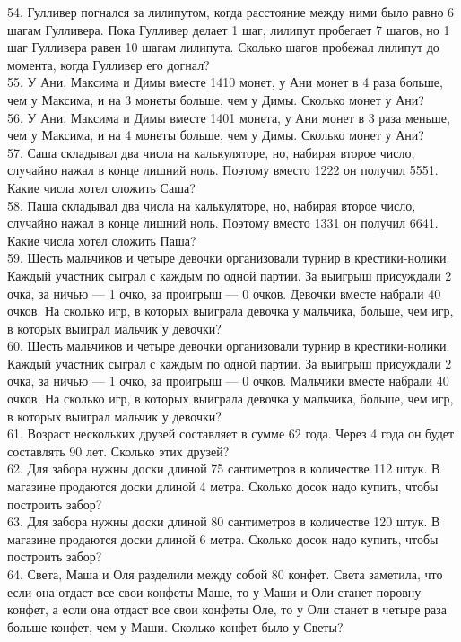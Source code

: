 54. Гулливер погнался за лилипутом, когда расстояние между ними было равно 6 шагам Гулливера. Пока Гулливер делает 1 шаг, лилипут пробегает 7 шагов, но 1 шаг Гулливера равен 10 шагам лилипута. Сколько шагов пробежал лилипут до момента, когда Гулливер его догнал?\\
55. У Ани, Максима и Димы вместе 1410 монет, у Ани монет в 4 раза больше, чем у Максима, и на 3 монеты больше, чем у Димы. Сколько монет у Ани?\\
56. У Ани, Максима и Димы вместе 1401 монета, у Ани монет в 3 раза меньше, чем у Максима, и на 4 монеты больше, чем у Димы. Сколько монет у Ани?\\
57. Саша складывал два числа на калькуляторе, но, набирая второе число, случайно нажал в конце лишний ноль. Поэтому вместо 1222 он получил 5551. Какие числа хотел сложить Саша?\\
58. Паша складывал два числа на калькуляторе, но, набирая второе число, случайно нажал в конце лишний ноль. Поэтому вместо 1331 он получил 6641. Какие числа хотел сложить Паша?\\
59. Шесть мальчиков и четыре девочки организовали турнир в крестики-нолики. Каждый участник сыграл с каждым по одной партии. За выигрыш присуждали 2 очка, за ничью --- 1 очко, за проигрыш --- 0 очков. Девочки вместе набрали 40 очков. На сколько игр, в которых выиграла девочка у мальчика, больше, чем игр, в которых выиграл мальчик у девочки?\\
60. Шесть мальчиков и четыре девочки организовали турнир в крестики-нолики. Каждый участник сыграл с каждым по одной партии. За выигрыш присуждали 2 очка, за ничью --- 1 очко, за проигрыш --- 0 очков. Мальчики вместе набрали 40 очков. На сколько игр, в которых выиграла девочка у мальчика, больше, чем игр, в которых выиграл мальчик у девочки?\\
61. Возраст нескольких друзей составляет в сумме 62 года. Через 4 года он будет составлять 90 лет. Сколько этих друзей?\\
62. Для забора нужны доски длиной 75 сантиметров в количестве 112 штук. В магазине продаются доски длиной 4 метра. Сколько досок надо купить, чтобы построить забор?\\
63. Для забора нужны доски длиной 80 сантиметров в количестве 120 штук. В магазине продаются доски длиной 6 метра. Сколько досок надо купить, чтобы построить забор?\\
64. Света, Маша и Оля разделили между собой 80 конфет. Света заметила, что если она отдаст все свои конфеты Маше, то у Маши и Оли станет поровну конфет, а если она отдаст все свои конфеты Оле, то у Оли станет в четыре раза больше конфет, чем у Маши. Сколько конфет было у Светы?\\
